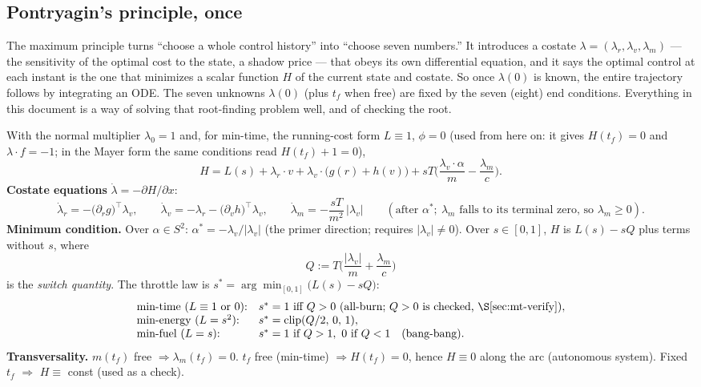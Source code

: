 \documentclass[11pt]{article}
\newcommand{\lv}{\lambda_v}\newcommand{\lr}{\lambda_r}\newcommand{\lm}{\lambda_m}
\newcommand{\tf}{t_f}\newcommand{\R}{\mathbb{R}}
\begin{document}
\subsection{Pontryagin's principle, once}\label{sec:pmp}
\begin{intu}
The maximum principle turns ``choose a whole control history'' into
``choose seven numbers.'' It introduces a costate $\lambda=(\lr,\lv,\lm)$ ---
the sensitivity of the optimal cost to the state, a shadow price --- that
obeys its own differential equation, and it says the optimal control at each
instant is the one that minimizes a scalar function $H$ of the current state
and costate. So once $\lambda(0)$ is known, the entire trajectory follows by
integrating an ODE. The seven unknowns $\lambda(0)$ (plus $\tf$ when free) are
fixed by the seven (eight) end conditions. Everything in this document is a
way of solving that root-finding problem well, and of checking the root.
\end{intu}
\begin{rig}
With the normal multiplier $\lambda_0=1$ and, for min-time, the running-cost form $L\equiv1$, $\phi=0$ (used from here on: it gives $H(\tf)=0$ and $\lambda\cdot f=-1$; in the Mayer form the same conditions read $H(\tf)+1=0$),
\begin{equation}\label{eq:H}
H = L(s) + \lr\!\cdot v + \lv\!\cdot\big(g(r)+h(v)\big) + sT\Big(\frac{\lv\!\cdot\alpha}{m}-\frac{\lm}{c}\Big).
\end{equation}
\textbf{Costate equations} $\dot\lambda=-\partial H/\partial x$:
\begin{equation}\label{eq:costate}
\dot\lr = -\big(\partial_r g\big)^{\!\top}\lv,\qquad
\dot\lv = -\lr - \big(\partial_v h\big)^{\!\top}\lv,\qquad
\dot\lm = -\frac{sT}{m^2}\,|\lv|\qquad(\text{after }\alpha^*;\ \lm\text{ falls to its terminal zero, so }\lm\ge0).
\end{equation}
\textbf{Minimum condition.} Over $\alpha\in S^2$: $\alpha^*=-\lv/|\lv|$ (the
primer direction; requires $|\lv|\ne0$). Over $s\in[0,1]$, $H$ is
$L(s)-sQ$ plus terms without $s$, where
\begin{equation}\label{eq:Q}
Q := T\Big(\frac{|\lv|}{m}+\frac{\lm}{c}\Big)
\end{equation}
is the \emph{switch quantity}. The throttle law is $s^*=\arg\min_{[0,1]}\big(L(s)-sQ\big)$:
\[
\begin{array}{ll}
\text{min-time (}L\equiv1\text{ or }0\text{):} & s^*=1 \text{ iff } Q>0 \ (\text{all-burn; } Q>0 \text{ is checked, \S\ref{sec:mt-verify}}),\\
\text{min-energy (}L=s^2\text{):} & s^*=\mathrm{clip}(Q/2,\,0,\,1),\\
\text{min-fuel (}L=s\text{):} & s^*=1 \text{ if } Q>1,\ 0 \text{ if } Q<1 \quad(\text{bang-bang}).
\end{array}
\]
\textbf{Transversality.} $m(\tf)$ free $\Rightarrow \lm(\tf)=0$. $\tf$ free
(min-time) $\Rightarrow H(\tf)=0$, hence $H\equiv0$ along the arc (autonomous
system). Fixed $\tf$ $\Rightarrow$ $H\equiv$ const (used as a check).
\end{rig}
\end{document}
